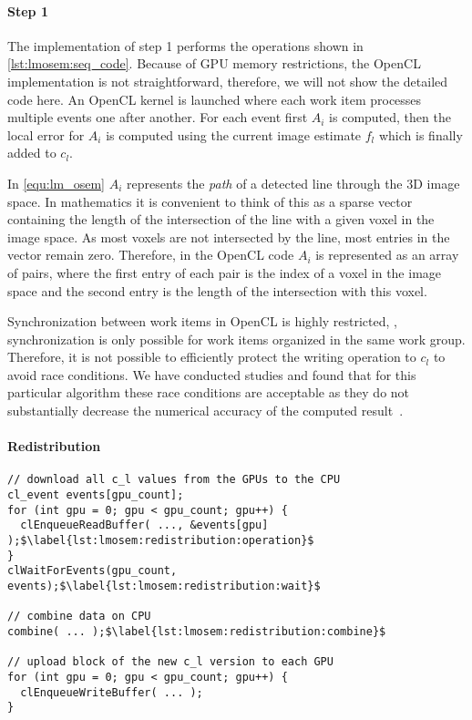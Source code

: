 \paragraph{Step 1}
The implementation of step 1 performs the operations shown in \autoref{lst:lmosem:seq_code}.
Because of GPU memory restrictions, the OpenCL implementation is not straightforward, therefore, we will not show the detailed code here.
An OpenCL kernel is launched where each work item processes multiple events one after another.
For each event first $A_i$ is computed, then the local error for $A_i$ is computed using the current image estimate $f_l$ which is finally added to $c_l$.

In \autoref{equ:lm_osem} $A_i$ represents the \emph{path} of a detected line through the 3D image space.
In mathematics it is convenient to think of this as a sparse vector containing the length of the intersection of the line with a given voxel in the image space.
As most voxels are not intersected by the line, most entries in the vector remain zero.
Therefore, in the OpenCL code $A_i$ is represented as an array of pairs, where the first entry of each pair is the index of a voxel in the image space and the second entry is the length of the intersection with this voxel.

Synchronization between work items in OpenCL is highly restricted, \ie, synchronization is only possible for work items organized in the same work group.
Therefore, it is not possible to efficiently protect the writing operation to $c_l$ to avoid race conditions.
We have conducted studies and found that for this particular algorithm these race conditions are acceptable as they do not substantially decrease the numerical accuracy of the computed result~\cite{SchellmannGoMeKoScWuBu2009}.


\paragraph{Redistribution}

\begin{lstlisting}[float,
  caption={OpenCL pseudocode for the redistribution phase},
  label={lst:lmosem:redistribution}]
// download all c_l values from the GPUs to the CPU
cl_event events[gpu_count];
for (int gpu = 0; gpu < gpu_count; gpu++) {
  clEnqueueReadBuffer( ..., &events[gpu] );$\label{lst:lmosem:redistribution:operation}$
}
clWaitForEvents(gpu_count, events);$\label{lst:lmosem:redistribution:wait}$

// combine data on CPU
combine( ... );$\label{lst:lmosem:redistribution:combine}$

// upload block of the new c_l version to each GPU
for (int gpu = 0; gpu < gpu_count; gpu++) {
  clEnqueueWriteBuffer( ... );
}
\end{lstlisting}

